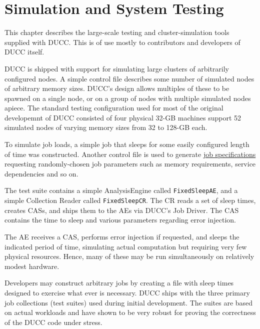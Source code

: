 \ifpdf
\else
{}
\fi
\chapter{Simulation and System Testing}
\label{chap:simulation}
    This chapter describes the large-scale testing and cluster-simulation 
    tools supplied with DUCC. This is of use mostly to contributors and 
    developers of DUCC itself.

    DUCC is shipped with support for simulating large clusters of arbitrarily 
    configured nodes.  A simple control file describes some number of
    simulated nodes of arbitrary memory sizes.  DUCC's design allows multiples
    of these to be spawned on a single node, or on a group of nodes with 
    multiple simulated nodes apiece.  The standard testing configuration 
    used for most of the original developemnt of DUCC consisted of four
    physical 32-GB machines support 52 simulated nodes of varying memory
    sizes from 32 to 128-GB each.

    To simulate job loads, a simple job that sleeps for some easily configured
    length of time was constructed.  Another control file is used to
    generate \hyperref[sec:cli.ducc-submit]{job specifications} requesting randomly-chosen
    job parameters such as memory requirements, service dependencies and so on.

    The test suite contains a simple AnalysisEngine called
    {\tt FixedSleepAE}, and a simple Collection Reader called
    {\tt FixedSleepCR}.  The CR reads a set of sleep times, creates
    CASs, and ships them to the AEs via DUCC's Job Driver.  The CAS
    contains the time to sleep and various parameters regarding
    error injection.

    The AE receives a CAS, performs error injection if requested, and
    sleeps the indicated period of time, simulating actual computation
    but requiring very few physical resources.  Hence, many of these 
    may be run simultaneously on relatively modest hardware.

    Developers may construct arbitrary jobs by creating a file with
    sleep times designed to exercise what ever is necessary.  DUCC 
    ships with the three primary job collections (test suites) used
    during initial development.  The suites are based on actual 
    workloads and have shown to be very robust for proving the correctness
    of the DUCC code under stress.

